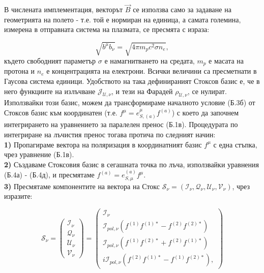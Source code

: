 \begin{appendices}
В числената имплементация, векторът $\vec{B}$ се използва само за задаване на геометрията на полето - т.е. той е нормиран на единица, а самата големина, измерена в отправната система на плазмата, се пресмята с израза:

\begin{equation}
	\sqrt{b^\mu b_\nu} = \sqrt{4\pi m_pc^2 \sigma n_e},
\end{equation}
където свободният параметър $\sigma$ е намагнитването на средата, $m_p$ е масата на протона и $n_e$ е концентрацията на електрони. Всички величини са пресметнати в Гаусова система единици. Удобството на така дефинираният Стоксов базис е, че в него функциите на излъчване $\mathcal{J}_{\mathcal{U},\nu}$, и тези на Фарадей $\rho_{\mathcal{U},\nu}$, се нулират.\\

Използвайки този базис, можем да трансформираме началното условие (Б.3б) от Стоксов базис към координатен (т.е. $f^\mu = e^\mu_{S, (a)}f^{(a)}$) с което да започнем интегрирането на уравнението за паралелен пренос (Б.1в). Процедурата по интегриране на лъчистия пренос тогава протича по следният начин:\\

\textbf{1)} Пропагираме вектора на поляризация в координатният базис $f^\mu$ с една стъпка, чрез уравнение (Б.1в).\\
\textbf{2)} Създаваме Стоксовия базис в сегашната точка по лъча, използвайки уравнения (Б.4а) - (Б.4д), и пресмятаме $f^{(a)} = e^{(a)}_{S,\mu} f^\mu$.\\
\textbf{3)} Пресмятаме компонентите на вектора на Стокс $\mathcal{S}_\nu = (\mathcal{I}_\nu, \mathcal{Q}_\nu, \mathcal{U}_\nu, \mathcal{V}_\nu)$, чрез изразите:

\begin{equation}
	\mathcal{S}_\nu = \begin{pmatrix}
		\mathcal{I}_\nu \\
		\mathcal{Q}_\nu \\
		\mathcal{U}_\nu \\
		\mathcal{V}_\nu
	\end{pmatrix} = 
	\begin{pmatrix}
		\mathcal{I}_\nu \\
		\mathcal{I}_{pol, \nu} \left(f^{(1)} f^{(1)*} - f^{(2)} f^{(2)*} \right) \\
		\mathcal{I}_{pol, \nu} \left(f^{(1)} f^{(2)*} + f^{(2)} f^{(1)*} \right) \\
		i\mathcal{I}_{pol, \nu} \left(f^{(2)} f^{(1)*} - f^{(1)} f^{(2)*} \right),
	\end{pmatrix} 
\end{equation}


\end{appendices}
